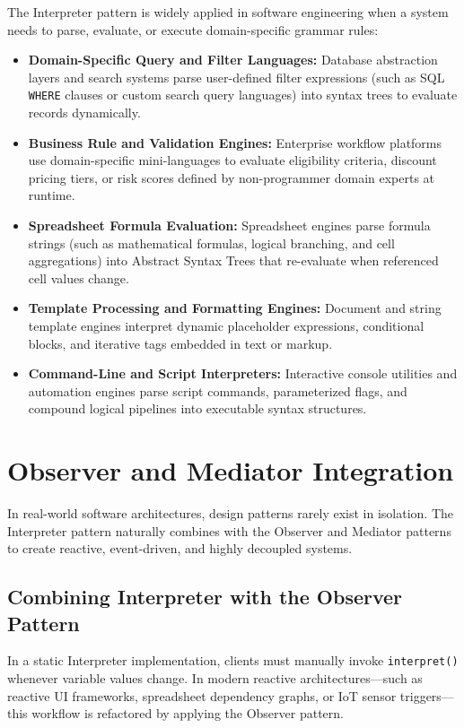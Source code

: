 \documentclass[12pt,a4paper]{article}
\begin{document}
The Interpreter pattern is widely applied in software engineering when a system needs to parse, evaluate, or execute domain-specific grammar rules:

\begin{itemize}
    \item \textbf{Domain-Specific Query and Filter Languages:} Database abstraction layers and search systems parse user-defined filter expressions (such as SQL \texttt{WHERE} clauses or custom search query languages) into syntax trees to evaluate records dynamically.
    \item \textbf{Business Rule and Validation Engines:} Enterprise workflow platforms use domain-specific mini-languages to evaluate eligibility criteria, discount pricing tiers, or risk scores defined by non-programmer domain experts at runtime.
    \item \textbf{Spreadsheet Formula Evaluation:} Spreadsheet engines parse formula strings (such as mathematical formulas, logical branching, and cell aggregations) into Abstract Syntax Trees that re-evaluate when referenced cell values change.
    \item \textbf{Template Processing and Formatting Engines:} Document and string template engines interpret dynamic placeholder expressions, conditional blocks, and iterative tags embedded in text or markup.
    \item \textbf{Command-Line and Script Interpreters:} Interactive console utilities and automation engines parse script commands, parameterized flags, and compound logical pipelines into executable syntax structures.
\end{itemize}

\newpage
\section{Observer and Mediator Integration}

In real-world software architectures, design patterns rarely exist in isolation. The Interpreter pattern naturally combines with the Observer and Mediator patterns to create reactive, event-driven, and highly decoupled systems.

\subsection{Combining Interpreter with the Observer Pattern}
In a static Interpreter implementation, clients must manually invoke \texttt{interpret()} whenever variable values change. In modern reactive architectures—such as reactive UI frameworks, spreadsheet dependency graphs, or IoT sensor triggers—this workflow is refactored by applying the Observer pattern.
\end{document}
